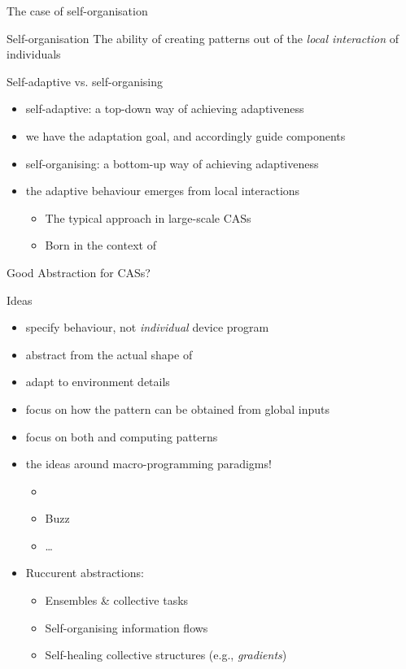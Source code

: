 \documentclass[presentation, 8pt]{beamer}\mode<presentation>{\usetheme{AMSBolognaFC}}
\begin{document}
\begin{frame}{The case of self-organisation}
\begin{alertblock}{Self-organisation}
	\centering
	The ability of creating  patterns out of the \emph{local interaction} of individuals
\end{alertblock}
\begin{exampleblock}{Self-adaptive vs. self-organising}
\begin{itemize}
	\item self-adaptive: a top-down way of achieving adaptiveness
	\item[\faArrowRight] we have the adaptation goal, and accordingly guide components 
	\item self-organising: a bottom-up way of achieving adaptiveness
	\item[\faArrowRight] the adaptive behaviour emerges from local interactions
	\begin{itemize}
		\item The typical approach in large-scale CASs
		\item Born in the context of 
	\end{itemize}
\end{itemize}
\end{exampleblock}
\end{frame}
\begin{frame}{Good Abstraction for CASs?}
\begin{alertblock}{Ideas}
	\begin{itemize}
		\item specify  behaviour, not \emph{individual} device program
		\item abstract from the actual shape of 
		\item {} adapt to environment details
		\item focus on how the  pattern can be obtained from global inputs
		\item focus on both  and  computing patterns
		\item[\faArrowRight] the ideas around macro-programming paradigms!
		\begin{itemize}
			\item {}
			\item Buzz
			\item \dots
		\end{itemize}
		\item Ruccurent abstractions:
		\begin{itemize}
			\item Ensembles \& collective tasks
			\item Self-organising information flows
			\item Self-healing collective structures (e.g., \emph{gradients})
		\end{itemize}
	\end{itemize}
\end{alertblock}
\end{frame}
\end{document}
